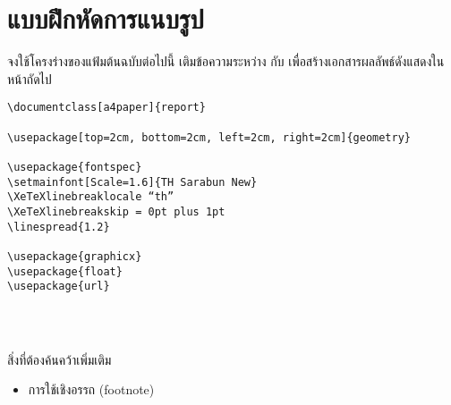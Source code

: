 \chapter{แบบฝึกหัดการแนบรูป}
จงใช้โครงร่างของแฟ้มต้นฉบับต่อไปนี้ เติมข้อความระหว่าง \lstinline|| กับ \lstinline|| เพื่อสร้างเอกสารผลลัพธ์ดังแสดงในหน้าถัดไป

\begin{lstlisting}
\documentclass[a4paper]{report}

\usepackage[top=2cm, bottom=2cm, left=2cm, right=2cm]{geometry}

\usepackage{fontspec}
\setmainfont[Scale=1.6]{TH Sarabun New}
\XeTeXlinebreaklocale “th”
\XeTeXlinebreakskip = 0pt plus 1pt
\linespread{1.2}

\usepackage{graphicx}
\usepackage{float}
\usepackage{url}




\end{lstlisting}

สิ่งที่ต้องค้นคว้าเพิ่มเติม
\begin{itemize}
	\item การใช้เชิงอรรถ (footnote)
\end{itemize}

\newpage


